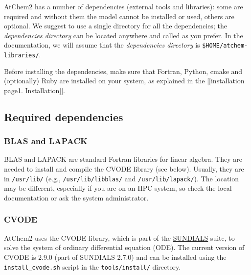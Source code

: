 AtChem2 has a number of dependencies (external tools and libraries):
some are required and without them the model cannot be installed or
used, others are optional. We suggest to use a single directory for all
the dependencies; the \emph{dependencies directory} can be located
anywhere and called as you prefer. In the documentation, we will assume
that the \emph{dependencies directory} is
\texttt{\$HOME/atchem-libraries/}.

Before installing the dependencies, make sure that Fortran, Python,
cmake and (optionally) Ruby are installed on your system, as explained
in the {[}{[}installation page\textbar{}1. Installation{]}{]}.

\subsection{Required dependencies} \label{required-dependencies}

\subsubsection{BLAS and LAPACK} \label{blas-and-lapack}

BLAS and LAPACK are standard Fortran libraries for linear algebra. They
are needed to install and compile the CVODE library (see below).
Usually, they are in \texttt{/usr/lib/} (e.g.,
\texttt{/usr/lib/libblas/} and \texttt{/usr/lib/lapack/}). The location
may be different, especially if you are on an HPC system, so check the
local documentation or ask the system administrator.

\subsubsection{CVODE} \label{cvode}

AtChem2 uses the CVODE library, which is part of the
\href{https://computation.llnl.gov/projects/sundials}{SUNDIALS} suite,
to solve the system of ordinary differential equation (ODE). The current
version of CVODE is 2.9.0 (part of SUNDIALS 2.7.0) and can be installed
using the \texttt{install\_cvode.sh} script in the
\texttt{tools/install/} directory.

